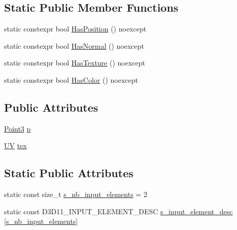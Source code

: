 \subsection*{Static Public Member Functions}
\begin{DoxyCompactItemize}
\item 
static constexpr bool \hyperlink{structmage_1_1_vertex_position_texture_a73b976c9cf9259da522a84ab4075db78}{Has\+Position} () noexcept
\item 
static constexpr bool \hyperlink{structmage_1_1_vertex_position_texture_a0b50c61258a2778faf9141a916e6b4d0}{Has\+Normal} () noexcept
\item 
static constexpr bool \hyperlink{structmage_1_1_vertex_position_texture_a8812d80a2f933fdbea33cfd356245c2d}{Has\+Texture} () noexcept
\item 
static constexpr bool \hyperlink{structmage_1_1_vertex_position_texture_ae25de798fcf1dd6383ed9b85e20cae54}{Has\+Color} () noexcept
\end{DoxyCompactItemize}
\subsection*{Public Attributes}
\begin{DoxyCompactItemize}
\item 
\hyperlink{structmage_1_1_point3}{Point3} \hyperlink{structmage_1_1_vertex_position_texture_a49253c4db52d1a4905838ba6ed6c52c6}{p}
\item 
\hyperlink{structmage_1_1_u_v}{UV} \hyperlink{structmage_1_1_vertex_position_texture_a9b4efa25d268c812892ecffc2582496e}{tex}
\end{DoxyCompactItemize}
\subsection*{Static Public Attributes}
\begin{DoxyCompactItemize}
\item 
static const size\+\_\+t \hyperlink{structmage_1_1_vertex_position_texture_a59bcde456e768910c7f39c7b740b4961}{s\+\_\+nb\+\_\+input\+\_\+elements} = 2
\item 
static const D3\+D11\+\_\+\+I\+N\+P\+U\+T\+\_\+\+E\+L\+E\+M\+E\+N\+T\+\_\+\+D\+E\+SC \hyperlink{structmage_1_1_vertex_position_texture_a80b0fac785de688b33c155ea212c2cf3}{s\+\_\+input\+\_\+element\+\_\+desc} \mbox{[}\hyperlink{structmage_1_1_vertex_position_texture_a59bcde456e768910c7f39c7b740b4961}{s\+\_\+nb\+\_\+input\+\_\+elements}\mbox{]}
\end{DoxyCompactItemize}


